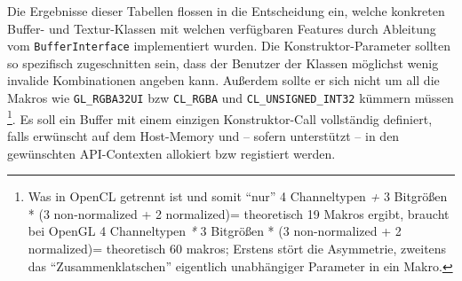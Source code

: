 	Die Ergebnisse dieser Tabellen flossen in die Entscheidung ein, welche konkreten Buffer-
	und Textur-Klassen mit welchen  verfügbaren Features durch Ableitung vom
	\lstinline|BufferInterface| implementiert wurden. Die Konstruktor-Parameter sollten
	so spezifisch zugeschnitten sein, dass der Benutzer der Klassen möglichst wenig invalide
	Kombinationen angeben kann. Außerdem sollte er sich nicht um all die Makros
	wie \lstinline|GL_RGBA32UI| bzw \lstinline|CL_RGBA| und \lstinline|CL_UNSIGNED_INT32|
	kümmern müssen 
	\footnote{Was in OpenCL getrennt ist und somit "`nur"' 
		4 Channeltypen \emph{+} 3 Bitgrößen * (3 non-normalized + 2 normalized)= theoretisch 19 Makros ergibt,
		braucht bei OpenGL
			4 Channeltypen \emph{*} 3 Bitgrößen * (3 non-normalized + 2 normalized)= theoretisch 60 makros;
			Erstens stört die Asymmetrie, zweitens das "`Zusammenklatschen"' eigentlich unabhängiger Parameter in ein 
			Makro.}. 
	Es soll ein Buffer mit einem einzigen Konstruktor-Call vollständig definiert,
	falls erwünscht auf dem Host-Memory und -- sofern unterstützt --
	in den gewünschten API-Contexten allokiert bzw registiert werden.
	
